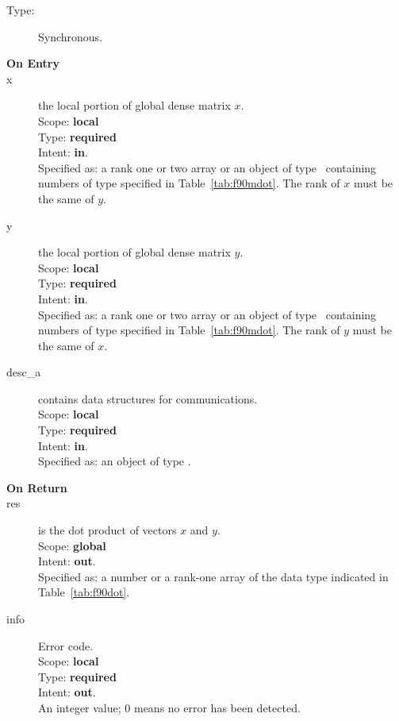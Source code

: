 \begin{description}
\item[Type:] Synchronous.
\item[\bf On Entry]
\item[x] the local portion of global dense matrix
$x$. \\
Scope: {\bf local} \\
Type: {\bf required} \\
Intent: {\bf in}.\\
Specified as:  a rank one or two array or an object of type \vdata\ 
containing numbers of type specified in
Table~\ref{tab:f90mdot}. The rank of $x$ must be the same of $y$. 
\item[y] the local portion of global dense matrix
$y$. \\
Scope: {\bf local} \\
Type: {\bf required} \\
Intent: {\bf in}.\\
Specified as:  a rank one or two array or an object of type \vdata\ 
containing numbers of type specified in
Table~\ref{tab:f90mdot}. The rank of $y$ must be the same of $x$. 
\item[desc\_a] contains data structures for communications.\\
Scope: {\bf local} \\
Type: {\bf required}\\
Intent: {\bf in}.\\
Specified as: an object of type \descdata.
\item[\bf On Return] 
\item[res] is the dot product of vectors $x$ and $y$.\\
Scope: {\bf global} \\
Intent: {\bf out}.\\
Specified as: a number or a rank-one array  of the data type indicated
in Table~\ref{tab:f90dot}. 
\item[info] Error code.\\
Scope: {\bf local} \\
Type: {\bf required} \\
Intent: {\bf out}.\\
An integer value; 0 means no error has been detected. 
\end{description}

%
%


